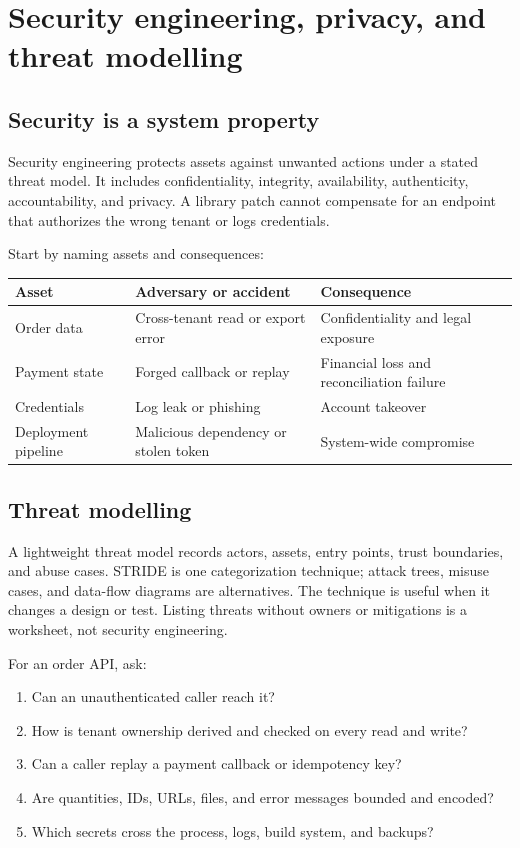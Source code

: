 \chapter{Security engineering, privacy, and threat modelling}

\section{Security is a system property}
Security engineering protects assets against unwanted actions under a stated
threat model. It includes confidentiality, integrity, availability, authenticity,
accountability, and privacy. A library patch cannot compensate for an endpoint
that authorizes the wrong tenant or logs credentials.

Start by naming assets and consequences:

\noindent\begin{tabularx}{\textwidth}{@{}p{}p{}X@{}}
\toprule
Asset & Adversary or accident & Consequence \\
\midrule
Order data & Cross-tenant read or export error & Confidentiality and legal exposure \\
Payment state & Forged callback or replay & Financial loss and reconciliation failure \\
Credentials & Log leak or phishing & Account takeover \\
Deployment pipeline & Malicious dependency or stolen token & System-wide compromise \\
\bottomrule
\end{tabularx}

\section{Threat modelling}
A lightweight threat model records actors, assets, entry points, trust boundaries,
and abuse cases. STRIDE is one categorization technique; attack trees, misuse
cases, and data-flow diagrams are alternatives. The technique is useful when it
changes a design or test. Listing threats without owners or mitigations is a
worksheet, not security engineering.

For an order API, ask:

\begin{enumerate}
  \item Can an unauthenticated caller reach it?
  \item How is tenant ownership derived and checked on every read and write?
  \item Can a caller replay a payment callback or idempotency key?
  \item Are quantities, IDs, URLs, files, and error messages bounded and encoded?
  \item Which secrets cross the process, logs, build system, and backups?
\end{enumerate}

